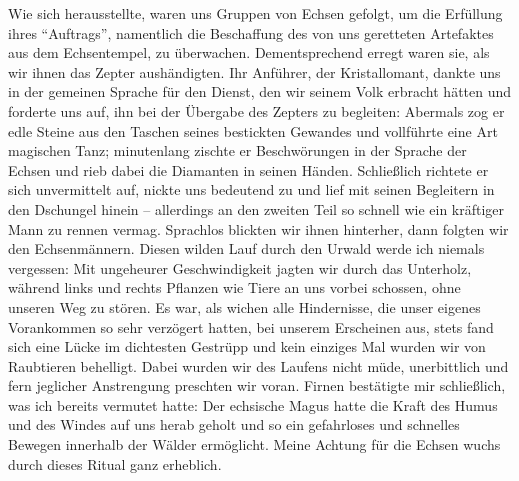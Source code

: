 Wie sich herausstellte, waren uns Gruppen von Echsen gefolgt, um die Erfüllung ihres ``Auftrags'', namentlich die Beschaffung des von uns geretteten Artefaktes aus dem Echsentempel, zu überwachen. Dementsprechend erregt waren sie, als wir ihnen das Zepter aushändigten. Ihr Anführer, der Kristallomant, dankte uns in der gemeinen Sprache für den Dienst, den wir seinem Volk erbracht hätten und forderte uns auf, ihn bei der Übergabe des Zepters zu begleiten: Abermals zog er edle Steine aus den Taschen seines bestickten Gewandes und vollführte eine Art magischen Tanz; minutenlang zischte er Beschwörungen in der Sprache der Echsen und rieb dabei die Diamanten in seinen Händen. Schließlich richtete er sich unvermittelt auf, nickte uns bedeutend zu und lief mit seinen Begleitern in den Dschungel hinein -- allerdings an den zweiten Teil so schnell wie ein kräftiger Mann zu rennen vermag. Sprachlos blickten wir ihnen hinterher, dann folgten wir den Echsenmännern. Diesen wilden Lauf durch den Urwald werde ich niemals vergessen: Mit ungeheurer Geschwindigkeit jagten wir durch das Unterholz, während links und rechts Pflanzen wie Tiere an uns vorbei schossen, ohne unseren Weg zu stören. Es war, als wichen alle Hindernisse, die unser eigenes Vorankommen so sehr verzögert hatten, bei unserem Erscheinen aus, stets fand sich eine Lücke im dichtesten Gestrüpp und kein einziges Mal wurden wir von Raubtieren behelligt. Dabei wurden wir des Laufens nicht müde, unerbittlich und fern jeglicher Anstrengung preschten wir voran. Firnen bestätigte mir schließlich, was ich bereits vermutet hatte: Der echsische Magus hatte die Kraft des Humus und des Windes auf uns herab geholt und so ein gefahrloses und schnelles Bewegen innerhalb der Wälder ermöglicht. Meine Achtung für die Echsen wuchs durch dieses Ritual ganz erheblich.

